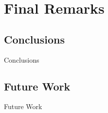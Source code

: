 \documentclass{../bredelebeamer}
\begin{document}
\section{Final Remarks}
\subsection{Conclusions}
\begin{frame}{Conclusions}

\end{frame}

\subsection{Future Work}
\begin{frame}{Future Work}

\end{frame}
\end{document}
